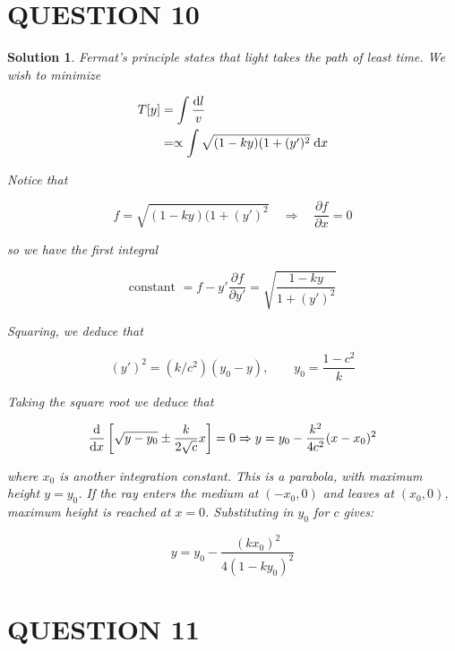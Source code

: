 \documentclass[a4paper]{article}
\newtheorem*{soln}{Solution}
\begin{document}
\section{QUESTION 10}


\begin{soln}
	Fermat's principle states that light takes the path of least time. We wish to minimize
	
	\begin{align*}
	T[y] & = \int \frac{\mathrm{d} l}{v} \\
	& = \propto \int  \sqrt{(1 - ky)(1+(y')^{2}} \; \mathrm{d} x
	\end{align*}
	
	Notice that 
	
	\[ f =  \sqrt{(1 - ky)(1+(y')^{2}} \quad \Rightarrow \quad \frac{\partial f }{\partial x} = 0\]
	
	so we have the first integral
	
		\[ \text{constant } = f - y' \frac{\partial f }{\partial y'} = \sqrt{\frac{1-ky}{1+(y')^{2}}}\]
		
	Squaring, we deduce that 
	
	\[ (y')^{2} = (k / c^{2}) (y_{0} - y), \qquad y_{0} = \frac{1 - c^{2}}{k} \]
	
	Taking the square root we deduce that
	
	\[ \frac{\mathrm{d} }{\mathrm{d} x} \left[  \sqrt{y - y_{0}} \pm \frac{k}{2 \sqrt{c}} x \right] = 0 \Rightarrow y = y_{0} - \frac{k^{2}}{4 c^{2}} (x - x_{0})^{2}  \]
	
	where $ x_{0} $ is another integration constant. This is a parabola, with maximum height $ y = y_{0} $. If the ray enters the medium at $ (-x_{0},0) $ and leaves at $ (x_{0},0) $, maximum height is reached at $ x = 0 $. Substituting in $ y_{0} $ for $ c $ gives:
	
	\[ y = y_{0} - \frac{(kx_{0})^{2}}{4(1-k y_{0})^{2}} \]
	
\end{soln}
 
\section{QUESTION 11}
\end{document}
